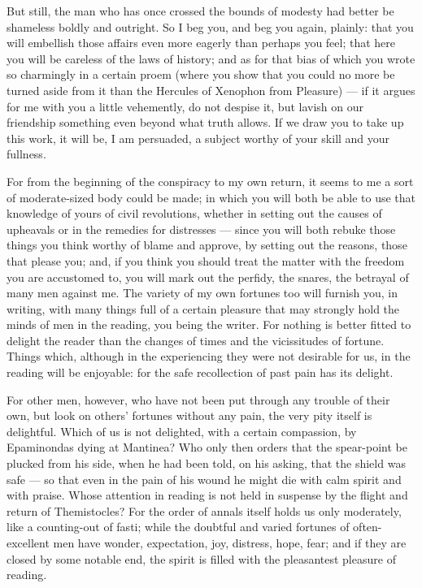  But still, the man who has once crossed the bounds of modesty had better be shameless boldly and outright. So I beg you, and beg you again, plainly: that you will embellish those affairs even more eagerly than perhaps you feel; that here you will be careless of the laws of history; and as for that bias of which you wrote so charmingly in a certain proem (where you show that you could no more be turned aside from it than the Hercules of Xenophon from Pleasure) --- if it argues for me with you a little vehemently, do not despise it, but lavish on our friendship something even beyond what truth allows. If we draw you to take up this work, it will be, I am persuaded, a subject worthy of your skill and your fullness.

 For from the beginning of the conspiracy to my own return, it seems to me a sort of moderate-sized body could be made; in which you will both be able to use that knowledge of yours of civil revolutions, whether in setting out the causes of upheavals or in the remedies for distresses --- since you will both rebuke those things you think worthy of blame and approve, by setting out the reasons, those that please you; and, if you think you should treat the matter with the freedom you are accustomed to, you will mark out the perfidy, the snares, the betrayal of many men against me. The variety of my own fortunes too will furnish you, in writing, with many things full of a certain pleasure that may strongly hold the minds of men in the reading, you being the writer. For nothing is better fitted to delight the reader than the changes of times and the vicissitudes of fortune. Things which, although in the experiencing they were not desirable for us, in the reading will be enjoyable: for the safe recollection of past pain has its delight.

 For other men, however, who have not been put through any trouble of their own, but look on others' fortunes without any pain, the very pity itself is delightful. Which of us is not delighted, with a certain compassion, by Epaminondas dying at Mantinea? Who only then orders that the spear-point be plucked from his side, when he had been told, on his asking, that the shield was safe --- so that even in the pain of his wound he might die with calm spirit and with praise. Whose attention in reading is not held in suspense by the flight and return of Themistocles? For the order of annals itself holds us only moderately, like a counting-out of fasti; while the doubtful and varied fortunes of often-excellent men have wonder, expectation, joy, distress, hope, fear; and if they are closed by some notable end, the spirit is filled with the pleasantest pleasure of reading.

